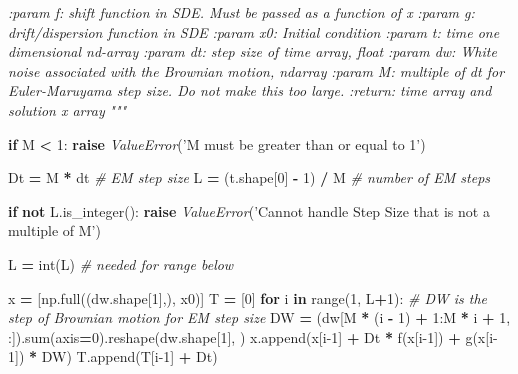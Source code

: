 \documentclass[]{article}
\newenvironment{Shaded}{\begin{snugshade}}{\end{snugshade}}
\newcommand{\BuiltInTok}[1]{#1}
\newcommand{\CommentTok}[1]{\textcolor[rgb]{0.56,0.35,0.01}{\textit{#1}}}
\newcommand{\ControlFlowTok}[1]{\textcolor[rgb]{0.13,0.29,0.53}{\textbf{#1}}}
\newcommand{\DecValTok}[1]{\textcolor[rgb]{0.00,0.00,0.81}{#1}}
\newcommand{\KeywordTok}[1]{\textcolor[rgb]{0.13,0.29,0.53}{\textbf{#1}}}
\newcommand{\NormalTok}[1]{#1}
\newcommand{\OperatorTok}[1]{\textcolor[rgb]{0.81,0.36,0.00}{\textbf{#1}}}
\newcommand{\PreprocessorTok}[1]{\textcolor[rgb]{0.56,0.35,0.01}{\textit{#1}}}
\newcommand{\StringTok}[1]{\textcolor[rgb]{0.31,0.60,0.02}{#1}}
\begin{document}
\begin{Shaded}
\begin{Highlighting}[]
\CommentTok{    :param f: shift function in SDE. Must be passed as a function of x}
\CommentTok{    :param g: drift/dispersion function in SDE}
\CommentTok{    :param x0: Initial condition}
\CommentTok{    :param t: time one dimensional nd-array}
\CommentTok{    :param dt: step size of time array, float}
\CommentTok{    :param dw: White noise associated with the Brownian motion, ndarray}
\CommentTok{    :param M: multiple of dt for Euler-Maruyama step size. Do not make this too large.}
\CommentTok{    :return: time array and solution x array}
\CommentTok{    """}

    \ControlFlowTok{if}\NormalTok{ M }\OperatorTok{<} \DecValTok{1}\NormalTok{:}
        \ControlFlowTok{raise} \PreprocessorTok{ValueError}\NormalTok{(}\StringTok{'M must be greater than or equal to 1'}\NormalTok{)}

\NormalTok{    Dt }\OperatorTok{=}\NormalTok{ M }\OperatorTok{*}\NormalTok{ dt  }\CommentTok{# EM step size}
\NormalTok{    L }\OperatorTok{=}\NormalTok{ (t.shape[}\DecValTok{0}\NormalTok{] }\OperatorTok{-} \DecValTok{1}\NormalTok{) }\OperatorTok{/}\NormalTok{ M  }\CommentTok{# number of EM steps}

    \ControlFlowTok{if} \KeywordTok{not}\NormalTok{ L.is_integer():}
        \ControlFlowTok{raise} \PreprocessorTok{ValueError}\NormalTok{(}\StringTok{'Cannot handle Step Size that is not a multiple of M'}\NormalTok{)}

\NormalTok{    L }\OperatorTok{=} \BuiltInTok{int}\NormalTok{(L)  }\CommentTok{# needed for range below}

\NormalTok{    x }\OperatorTok{=}\NormalTok{ [np.full((dw.shape[}\DecValTok{1}\NormalTok{],), x0)]}
\NormalTok{    T }\OperatorTok{=}\NormalTok{ [}\DecValTok{0}\NormalTok{]}
    \ControlFlowTok{for}\NormalTok{ i }\KeywordTok{in} \BuiltInTok{range}\NormalTok{(}\DecValTok{1}\NormalTok{, L}\OperatorTok{+}\DecValTok{1}\NormalTok{):}
        \CommentTok{# DW is the step of Brownian motion for EM step size}
\NormalTok{        DW }\OperatorTok{=}\NormalTok{ (dw[M }\OperatorTok{*}\NormalTok{ (i }\OperatorTok{-} \DecValTok{1}\NormalTok{) }\OperatorTok{+} \DecValTok{1}\NormalTok{:M }\OperatorTok{*}\NormalTok{ i }\OperatorTok{+} \DecValTok{1}\NormalTok{, :]).}\BuiltInTok{sum}\NormalTok{(axis}\OperatorTok{=}\DecValTok{0}\NormalTok{).reshape(dw.shape[}\DecValTok{1}\NormalTok{], )}
\NormalTok{        x.append(x[i}\DecValTok{-1}\NormalTok{] }\OperatorTok{+}\NormalTok{ Dt }\OperatorTok{*}\NormalTok{ f(x[i}\DecValTok{-1}\NormalTok{]) }\OperatorTok{+}\NormalTok{ g(x[i}\DecValTok{-1}\NormalTok{]) }\OperatorTok{*}\NormalTok{ DW)}
\NormalTok{        T.append(T[i}\DecValTok{-1}\NormalTok{] }\OperatorTok{+}\NormalTok{ Dt)}


\end{Highlighting}
\end{Shaded}
\end{document}
